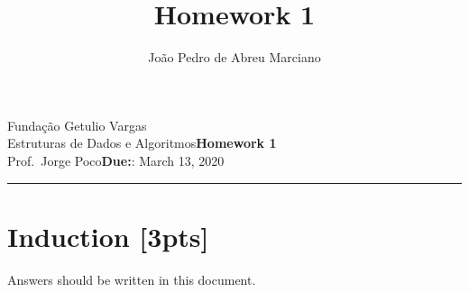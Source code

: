 \documentclass{article}
\title{Homework 1}
\author{João Pedro de Abreu Marciano}
\date{}
\newcommand{\assignment}{Homework 1}
\newcommand{\duedate}{March 13, 2020}
\begin{document}
Fundação Getulio Vargas\hfill\\
Estruturas de Dados e Algoritmos\hfill\textbf{\assignment}\\
Prof.\ Jorge Poco\hfill\textbf{Due:}: \duedate\\
\smallskip\hrule\bigskip

{\let\newpage\relax\maketitle}
\maketitle


\section{Induction [3pts]}
Answers should be written in this document. 
\end{document}
